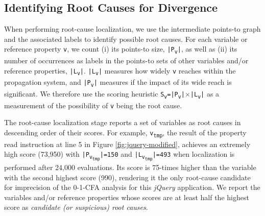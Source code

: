 
\subsection{Identifying Root Causes for Divergence}

When performing root-cause localization, we use the intermediate points-to graph and the associated labels to identify possible root causes. For each variable or reference property {\tt v}, we count (i) its points-to size, {\tt |P\textsubscript{v}|}, as well as (ii) its number of occurrences as labels in the points-to sets of other variables and/or reference properties, {\tt |L\textsubscript{v}|}. {\tt |L\textsubscript{v}|} measures how widely {\tt v} reaches within the propagation system, and {\tt |P\textsubscript{v}|} measures if the impact of its wide reach is significant. We therefore use the scoring heuristic {\tt S\textsubscript{v}=|P\textsubscript{v}|$\times$|L\textsubscript{v}|} as a measurement of the possibility of {\tt v} being the root cause. 

The root-cause localization stage reports a set of variables as root causes in descending order of their scores. For example, {\tt v\textsubscript{tmp}}, the result of the property read instruction at line 5 in Figure \ref{fig:jquery-modified}, achieves an extremely high score (73,950) with {\tt |P\textsubscript{v\textsubscript{tmp}}|=150} and {\tt |L\textsubscript{v\textsubscript{tmp}}|=493} when localization is performed after 24,000 evaluations. Its score is 75-times higher than the variable with the second highest score (990), rendering it the only root-cause candidate for imprecision of the 0-1-CFA analysis for this {\it jQuery} application. We report the variables and/or reference properties whose scores are at least half the highest score as {\it candidate (or suspicious) root causes}.

